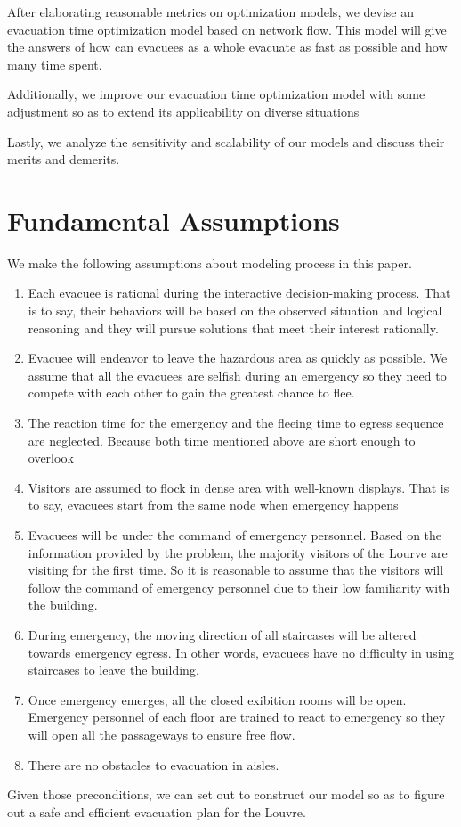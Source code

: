 \documentclass{mcmthesis}
\begin{document}
	After elaborating reasonable metrics on optimization models, we devise an evacuation time optimization model based on network flow. This model will give the answers of how can evacuees as a whole evacuate as fast as possible and how many time spent. 
	
	Additionally, we improve our evacuation time optimization model with some adjustment  so as to extend its applicability on diverse situations
	
	Lastly, we analyze the sensitivity and scalability of our models and discuss their merits and demerits.
	
	
	
	
\section{Fundamental  Assumptions}
We make the following assumptions about modeling process in this paper.
\begin{enumerate}[1.]
	\item  Each evacuee is rational during the interactive decision-making process. That is to say, their behaviors will be based on the observed situation and logical reasoning and they will pursue solutions that meet their interest rationally.
	\item Evacuee will endeavor to leave the hazardous area as quickly as possible. We assume that  all the evacuees are selfish during an emergency so they need to compete with each other to gain the greatest chance to flee.
	\item The reaction time for the emergency and the fleeing time to egress sequence are neglected. Because both time mentioned above are short enough to overlook
	\item Visitors are assumed to flock in dense area with well-known displays. That is to say, evacuees start from the same node when emergency happens
	\item Evacuees will be under the command of emergency personnel. Based on the information provided by the problem, the majority visitors of the Lourve are visiting for the first time. So it is reasonable to assume that the visitors will follow the command of emergency personnel due to their low familiarity with the building.
	\item During emergency, the moving direction of all staircases will be altered towards emergency egress. In other words, evacuees have no difficulty in using staircases to leave the building.
	\item Once emergency emerges, all the closed exibition rooms will be open. Emergency personnel of each floor are trained to react to emergency so they will open all the passageways to ensure free flow.
	\item There are no obstacles to evacuation in aisles.
\end{enumerate}
Given those preconditions, we can set out to construct our model so as to figure out a safe and efficient evacuation plan for the Louvre.
\end{document}
